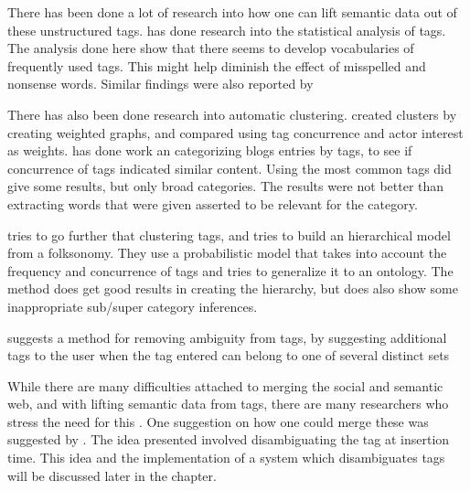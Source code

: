 There has been done a lot of research into how one can lift semantic data out of these unstructured tags.
\citet{Golder2005} has done research into the statistical analysis of tags.
The analysis done here show that there seems to develop vocabularies of frequently used tags.
This might help diminish the effect of misspelled and nonsense words. Similar findings were also reported by \citep{Shirky2007}

There has also been done research into automatic clustering.
\citet{Mika2005} created clusters by creating weighted graphs, and compared using tag concurrence and actor interest as weights.
\citet{Brooks2006} has done work an categorizing blogs entries by tags, to see if concurrence of tags indicated similar content.
Using the most common tags did give some results, but only broad categories. The results were not better than extracting words that were given asserted to be relevant for the category.

\citep{Tang2009} tries to go further that clustering tags, and tries to build an hierarchical model from a folksonomy.
They use a probabilistic model that takes into account the frequency and concurrence of tags and tries to generalize it to an ontology.
The method does get good results in creating the hierarchy, but does also show some inappropriate sub/super category inferences.

\citet{Weinberger2008} suggests a method for removing ambiguity from tags,
 by suggesting additional tags to the user when the tag entered can belong to one of several distinct sets

While there are many difficulties attached to merging the social and semantic web,
and with lifting semantic data from tags, there are many researchers who stress the need for this \citep{Passant2007,Mika2005, Gruber2007}.
One suggestion on how one could merge these was suggested by \citet{Veres2011}.
The idea presented involved disambiguating the tag at insertion time.
This idea and the implementation of a system which disambiguates tags will be discussed later in the chapter.

